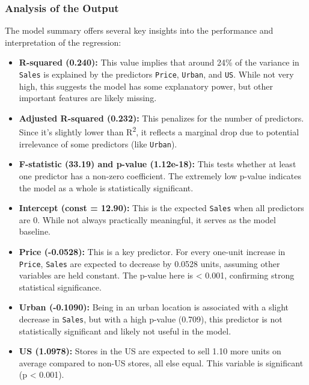 \documentclass[12pt]{article}
\begin{document}
\subsubsection*{Analysis of the Output}

The model summary offers several key insights into the performance and interpretation of the regression:

\begin{itemize}
  \item \textbf{R-squared (0.240):} This value implies that around 24\% of the variance in \texttt{Sales} is explained by the predictors \texttt{Price}, \texttt{Urban}, and \texttt{US}. While not very high, this suggests the model has some explanatory power, but other important features are likely missing.

  \item \textbf{Adjusted R-squared (0.232):} This penalizes for the number of predictors. Since it's slightly lower than R\textsuperscript{2}, it reflects a marginal drop due to potential irrelevance of some predictors (like \texttt{Urban}).

  \item \textbf{F-statistic (33.19) and p-value (1.12e-18):} This tests whether at least one predictor has a non-zero coefficient. The extremely low p-value indicates the model as a whole is statistically significant.

  \item \textbf{Intercept (const = 12.90):} This is the expected \texttt{Sales} when all predictors are 0. While not always practically meaningful, it serves as the model baseline.

  \item \textbf{Price (-0.0528):} This is a key predictor. For every one-unit increase in \texttt{Price}, \texttt{Sales} are expected to decrease by 0.0528 units, assuming other variables are held constant. The p-value here is < 0.001, confirming strong statistical significance.

  \item \textbf{Urban (-0.1090):} Being in an urban location is associated with a slight decrease in \texttt{Sales}, but with a high p-value (0.709), this predictor is not statistically significant and likely not useful in the model.

  \item \textbf{US (1.0978):} Stores in the US are expected to sell 1.10 more units on average compared to non-US stores, all else equal. This variable is significant (p < 0.001).


\end{itemize}
\end{document}

